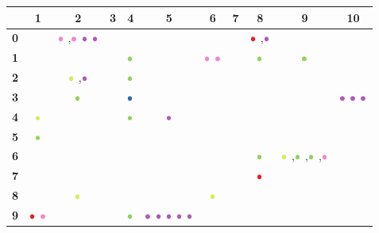 \documentclass{article}
\newcommand\Luke{{\color{Lavender}\bullet}\mathllap{\color{Lavender}\circ}}
\newcommand\Paul{{\color{YellowGreen}\bullet}\mathllap{\color{YellowGreen}\circ}}
\newcommand\Unknown{{\color{Orchid}\bullet}\mathllap{\color{Orchid}\circ}}
\newcommand\Matthew{{\color{Red}\bullet}\mathllap{\color{Red}\circ}}
\newcommand\John{{\color{GreenYellow}\bullet}\mathllap{\color{GreenYellow}\circ}}
\newcommand\Peter{{\color{NavyBlue}\bullet}\mathllap{\color{NavyBlue}\circ}}
\begin{document}
\begin{table}
\centering
\begin{tabular}{r|cccccccccc}
&{\bf1}&{\bf2}&{\bf3}&{\bf4}&{\bf5}&{\bf6}&{\bf7}&{\bf8}&{\bf9}&{\bf10}\\
\hline
{\bf 0}&&
$\Luke$%
,$\Luke$%
$\Unknown$%
$\Unknown$%
&&&&&&
$\Matthew$%
,$\Unknown$%
&&\\
{\bf 1}&&&&
$\Paul$%
&&
$\Luke$%
$\Luke$%
&&
$\Paul$%
&
$\Paul$%
&\\
{\bf 2}&&
$\John$%
,$\Unknown$%
&&
$\Paul$%
&&&&&&\\
{\bf 3}&&
$\Paul$%
&&
$\Peter$%
&&&&&&
$\Unknown$%
$\Unknown$%
$\Unknown$%
\\
{\bf 4}&
$\John$%
&&&
$\Paul$%
&
$\Unknown$%
&&&&&\\
{\bf 5}&
$\Paul$%
&&&&&&&&&\\
{\bf 6}&&&&&&&&
$\Paul$%
&
$\John$%
,$\Paul$%
,$\Paul$%
,$\Luke$%
&\\
{\bf 7}&&&&&&&&
$\Matthew$%
&&\\
{\bf 8}&&
$\John$%
&&&&
$\John$%
&&&&\\
{\bf 9}&
$\Matthew$%
$\Luke$%
&&&
$\Paul$%
&
$\Unknown$%
$\Unknown$%
$\Unknown$%
$\Unknown$%
$\Unknown$%
&&&&&\\

\end{tabular}
\end{table}
\end{document}
